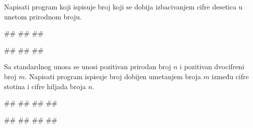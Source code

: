 \begin{Exercise}[label=p1.1_08] 
Napisati program koji ispisuje broj koji se dobija izbacivanjem cifre desetica u unetom prirodnom broju.

\begin{miditest}
\begin{upotreba}{1}
#\naslovInt#
##
##
\end{upotreba}
\end{miditest}
\begin{miditest}
\begin{upotreba}{2}
#\naslovInt#
##
##
\end{upotreba}
\end{miditest}

\end{Exercise}



\begin{Exercise}[label=p1_16]
Sa standardnog unosa se unosi pozitivan prirodan broj $n$ i pozitivan dvocifreni broj $m$. Napisati program ispisuje broj dobijen umetanjem broja $m$ između cifre stotina i cifre hiljada broja $n$. 

\begin{miditest}
\begin{upotreba}{1}
#\naslovInt#
##
##
##
\end{upotreba}
\end{miditest}  
\begin{miditest}
\begin{upotreba}{2}
#\naslovInt#
##
##
##
\end{upotreba}
\end{miditest}   

\end{Exercise}
\begin{Answer}[ref=p1_16]
\end{Answer}



